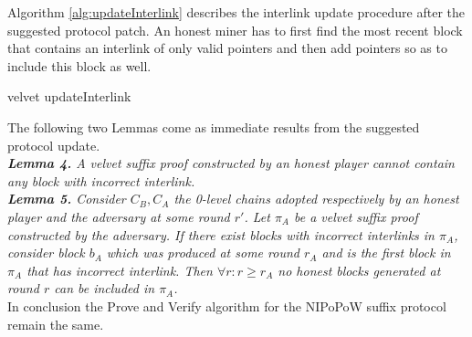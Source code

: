 Algorithm \ref{alg:updateInterlink} describes the interlink update procedure after the suggested protocol patch. An honest miner has to first find the most recent block that contains an interlink of only valid pointers and then add pointers so as to include this block as well.
\vspace{4mm}

\begin{algorithm}[H]
\SetAlgoNoLine
\DontPrintSemicolon
{}
\vspace{4mm}

\vspace{4mm}
 \caption{velvet updateInterlink}
 \label{alg:updateInterlink}
\end{algorithm}

\vspace{4mm}

The following two Lemmas come as immediate results from the suggested protocol update.\\

\textit{\textbf{Lemma 4.} A velvet suffix proof constructed by an honest player cannot contain any block with incorrect interlink.}\\

\textit{\textbf{Lemma 5.} Consider $C_B, C_A$ the 0-level chains adopted respectively by an honest player and the adversary at some round $r'$. Let $\pi_A$ be a velvet suffix proof constructed by the adversary. If there exist blocks with incorrect interlinks in $\pi_A$, consider block $b_A$ which was produced at some round $r_A$ and is the first block in $\pi_A$ that has incorrect interlink. Then $\forall r: r \geq r_A$ no honest blocks generated at round $r$ can be included in $\pi_A$.} \\

In conclusion the Prove and Verify algorithm for the NIPoPoW suffix protocol remain the same.
